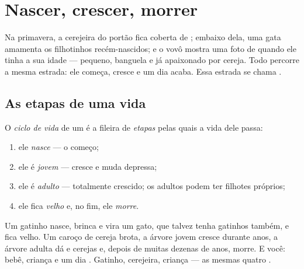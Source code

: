 \chapter{Nascer, crescer, morrer}\label{ch:g2:born-grow-die}

Na primavera, a cerejeira do portão fica coberta de ; embaixo
dela, uma gata amamenta os filhotinhos recém-nascidos; e o vovô
mostra uma foto de quando ele tinha a sua idade --- pequeno, banguela
e já apaixonado por cereja. Todo  percorre a mesma estrada:
ele começa, cresce e um dia acaba. Essa estrada se chama .

\section{As etapas de uma vida}

\begin{definition}\label{def:g2:born-grow-die:cycle}
O \emph{ciclo de vida} de um  é a
fileira de \emph{etapas} pelas quais a vida dele passa:
\begin{enumerate}
  \item ele \emph{nasce} --- o começo;
  \item ele é \emph{jovem} --- cresce e muda depressa;
  \item ele é \emph{adulto} --- totalmente crescido; os
        adultos podem ter filhotes próprios;
  \item ele fica \emph{velho} e, no fim, ele
        \emph{morre}.
\end{enumerate}
\end{definition}

\begin{example}\label{ex:g2:born-grow-die:three}
Um gatinho nasce, brinca e vira um gato, que talvez tenha gatinhos
também, e fica velho. Um caroço de cereja brota, a árvore jovem
cresce durante anos, a árvore adulta dá  e cerejas e, depois de
muitas dezenas de anos, morre. E você: bebê, criança e um dia .
Gatinho, cerejeira, criança --- as mesmas quatro .
\end{example}

